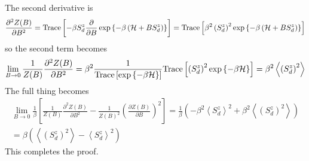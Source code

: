 \documentclass[12pt,twoside]{report}
\numberwithin{equation}{section}
\begin{document}
The second derivative is
\begin{equation}\begin{aligned}
	\frac{\partial^2{Z(B)}}{\partial{B^2}} = \text{Trace}\left[-\beta S_d^z  \frac{\partial{}}{\partial{B}}\exp\left\{-\beta \left( \mathcal{H} + BS_d^z \right) \right\}\right] = \text{Trace}\left[\beta^2 \left(S_d^z\right)^2 \exp\left\{-\beta \left( \mathcal{H} + BS_d^z \right) \right\}\right]
\end{aligned}\end{equation}
so the second term becomes
\begin{equation}\begin{aligned}
	\lim_{B \to 0}\frac{1}{Z(B)} \frac{\partial^2{Z(B)}}{\partial{B^2}} = \beta^2 \frac{1}{\text{Trace}\left[\exp\left\{-\beta \mathcal{H}\right\}\right]}\text{Trace}\left[\left(S_d^z\right)^2 \exp\left\{-\beta \mathcal{H}\right\}\right] = \beta^2 \left<\left(S_d^z\right)^2 \right>
\end{aligned}\end{equation}
The full thing becomes
\begin{equation}\begin{aligned}
	\lim_{B \to 0}\frac{1}{\beta}\left[\frac{1}{Z(B)} \frac{\partial^2{Z(B)}}{\partial{B^2}}-\frac{1}{Z(B)^2} \left(\frac{\partial{Z(B)}}{\partial{B}}\right)^2\right] = \frac{1}{\beta}\left(-\beta^2 \left<S_d^z\right>^2 + \beta^2 \left<\left(S_d^z\right)^2 \right>\right) \\
	= \beta \left(\left<\left(S_d^z\right)^2\right> - \left<S_d^z\right>^2\right) 
\end{aligned}\end{equation}
This completes the proof. 
\end{document}
